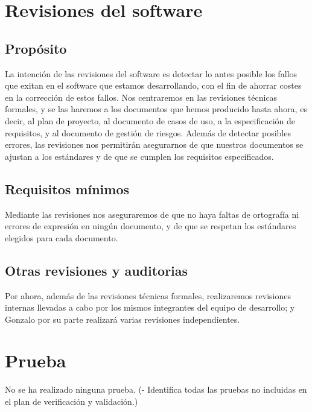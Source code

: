\documentclass[spanish,a4paper,11pt, twoside]{report}	%
\begin{document}
\chapter{ Revisiones del software}
	\section{Propósito}
	La intención de las revisiones del software es detectar lo antes posible los fallos que exitan en el software que estamos desarrollando, con el fin de ahorrar costes en la corrección de estos fallos. Nos centraremos en las revisiones técnicas formales,
	y se las haremos a los documentos que hemos producido hasta ahora, es decir, al plan de proyecto, al documento de casos de uso, a la especificación de requisitos, y al documento de gestión de riesgos. Además de detectar posibles errores,
 	las revisiones nos permitirán asegurarnos de que nuestros documentos se ajustan a los estándares y de que se cumplen los requisitos especificados.

	\section{Requisitos mínimos}
	Mediante las revisiones nos aseguraremos de que no haya faltas de ortografía ni errores de expresión en ningún documento, y de que se respetan los estándares elegidos para cada documento.
	\section{Otras revisiones y auditorias}
	Por ahora, además de las revisiones técnicas formales, realizaremos revisiones internas llevadas a cabo por los mismos integrantes del  equipo de desarrollo;  y Gonzalo por su parte realizará varias revisiones independientes.

\newpage
\mbox{}
\thispagestyle{empty}						%
\newpage

\chapter{ Prueba}%
	No se ha realizado ninguna prueba.
	(- Identifica todas las pruebas no incluidas en el plan
	de verificación y validación.)

\newpage
\mbox{}
\thispagestyle{empty}						%
\newpage
\end{document}
